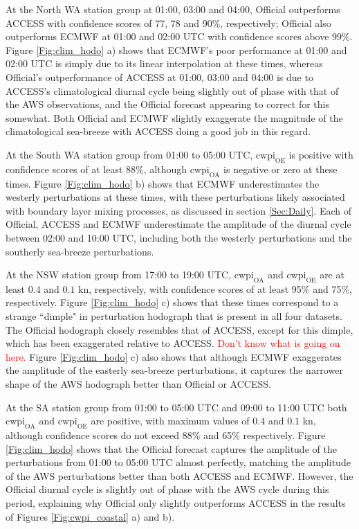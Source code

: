 \documentclass{ametsoc}
\begin{document}
At the North WA station group at 01:00, 03:00 and 04:00, Official outperforms ACCESS with confidence scores of 77, 78 and 90\%, respectively; Official also outperforms ECMWF at 01:00 and 02:00 UTC with confidence scores above 99\%. Figure \ref{Fig:clim_hodo} a) shows that ECMWF's poor performance at 01:00 and 02:00 UTC is simply due to its linear interpolation at these times, whereas Official's outperformance of ACCESS at 01:00, 03:00 and 04:00 is due to ACCESS's climatological diurnal cycle being slightly out of phase with that of the AWS observations, and the Official forecast appearing to correct for this somewhat. Both Official and ECMWF slightly exaggerate the magnitude of the climatological sea-breeze with ACCESS doing a good job in this regard.    

At the South WA station group from 01:00 to 05:00 UTC, $\text{cwpi}_\text{OE}$ is positive with confidence scores of at least $88\%$, although $\text{cwpi}_\text{OA}$ is negative or zero at these times. Figure \ref{Fig:clim_hodo} b) shows that ECMWF underestimates the westerly perturbations at these times, with these perturbations likely associated with boundary layer mixing processes, as discussed in section \ref{Sec:Daily}. Each of Official, ACCESS and ECMWF underestimate the amplitude of the diurnal cycle between 02:00 and 10:00 UTC, including both the westerly perturbations and the southerly sea-breeze perturbations. 

At the NSW station group from 17:00 to 19:00 UTC, $\text{cwpi}_\text{OA}$ and $\text{cwpi}_\text{OE}$ are at least $0.4$ and $0.1$ kn, respectively, with confidence scores of at least 95\% and 75\%, respectively. Figure \ref{Fig:clim_hodo} c) shows that these times correspond to a strange ``dimple" in perturbation hodograph that is present in all four datasets. The Official hodograph closely resembles that of ACCESS, except for this dimple, which has been exaggerated relative to ACCESS. \textcolor{red}{Don't know what is going on here.} Figure \ref{Fig:clim_hodo} c) also shows that although ECMWF exaggerates the amplitude of the easterly sea-breeze perturbations, it captures the narrower shape of the AWS hodograph better than Official or ACCESS. 

At the SA station group from 01:00 to 05:00 UTC and 09:00 to 11:00 UTC both $\text{cwpi}_\text{OA}$ and $\text{cwpi}_\text{OE}$ are positive, with maximum values of $0.4$ and $0.1$ kn, although confidence scores do not exceed 88\% and 65\% respectively. Figure \ref{Fig:clim_hodo} shows that the Official forecast captures the amplitude of the perturbations from 01:00 to 05:00 UTC almost perfectly, matching the amplitude of the AWS perturbations better than both ACCESS and ECMWF. However, the Official diurnal cycle is slightly out of phase with the AWS cycle during this period, explaining why Official only slightly outperforms ACCESS in the results of Figures \ref{Fig:cwpi_coastal} a) and b).      
\end{document}
